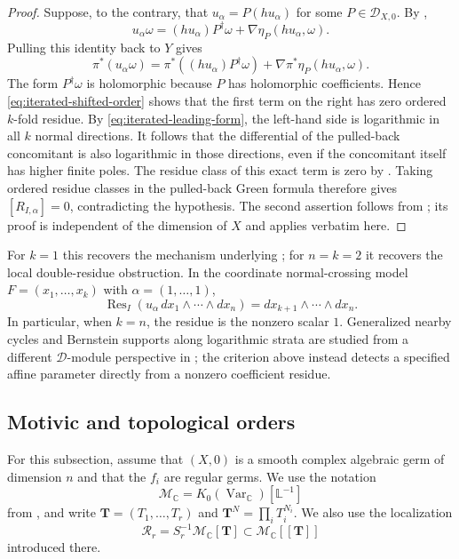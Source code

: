 \documentclass[12pt]{amsart}
\numberwithin{equation}{section}
\theoremstyle{plain}
\theoremstyle{definition}
\theoremstyle{remark}
\theoremstyle{definition}
\DeclareMathOperator{\Res}{Res}
\newcommand{\C}{\mathbb C}
\newcommand{\D}{\mathscr D}
\newcommand{\Lef}{\mathbb L}
\newcommand{\Mmot}{\mathcal M_{\mathbb C}}
\begin{document}
\begin{proof}
Suppose, to the contrary, that $u_\alpha=P(hu_\alpha)$ for some $P\in\D_{X,0}$. By ,
\begin{equation*}
u_\alpha\omega=(hu_\alpha)P^\dagger\omega+\nabla\eta_P(hu_\alpha,\omega).
\end{equation*}
Pulling this identity back to $Y$ gives
\begin{equation*}
\pi^*(u_\alpha\omega)=\pi^*((hu_\alpha)P^\dagger\omega)+\nabla\pi^*\eta_P(hu_\alpha,\omega).
\end{equation*}
The form $P^\dagger\omega$ is holomorphic because $P$ has holomorphic coefficients. Hence \eqref{eq:iterated-shifted-order} shows that the first term on the right has zero ordered $k$-fold residue. By \eqref{eq:iterated-leading-form}, the left-hand side is logarithmic in all $k$ normal directions. It follows that the differential of the pulled-back concomitant is also logarithmic in those directions, even if the concomitant itself has higher finite poles. The residue class of this exact term is zero by . Taking ordered residue classes in the pulled-back Green formula therefore gives $[R_{I,\alpha}]=0$, contradicting the hypothesis. The second assertion follows from ; its proof is independent of the dimension of $X$ and applies verbatim here.
\end{proof}

For $k=1$ this recovers the mechanism underlying ; for $n=k=2$ it recovers the local double-residue obstruction. In the coordinate normal-crossing model $F=(x_1,\ldots,x_k)$ with $\alpha=(1,\ldots,1)$,
\[
\Res_I\left(u_\alpha\,dx_1\wedge\cdots\wedge dx_n\right)
=
dx_{k+1}\wedge\cdots\wedge dx_n.
\]
In particular, when $k=n$, the residue is the nonzero scalar $1$. Generalized nearby cycles and Bernstein supports along logarithmic strata are studied from a different $\D$-module perspective in \cite{Wu2026}; the criterion above instead detects a specified affine parameter directly from a nonzero coefficient residue.

\subsection{Motivic and topological orders} \label{sec:higher-motivic-orders}

For this subsection, assume that $(X,0)$ is a smooth complex algebraic germ of dimension $n$ and that the $f_i$ are regular germs. We use the notation
\[
\Mmot=K_0(\operatorname{Var}_{\C})[\Lef^{-1}]
\]
from , and write $\mathbf T=(T_1,\ldots,T_r)$ and $\mathbf T^N=\prod_iT_i^{N_i}$. We also use the localization
\[
\mathscr R_r=S_r^{-1}\Mmot[\mathbf T]\subset\Mmot[\![\mathbf T]\!]
\]
introduced there.
\end{document}
